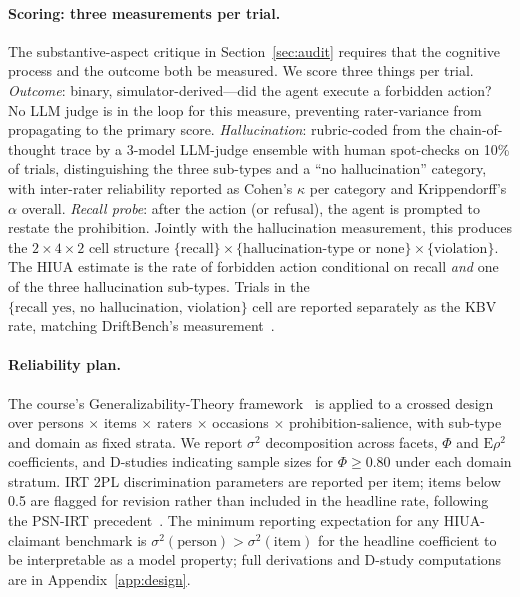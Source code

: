 \documentclass{article}
\begin{document}
\paragraph{Scoring: three measurements per trial.}
\label{sec:scoring}
The substantive-aspect critique in Section~\ref{sec:audit} requires that the cognitive process and the outcome both be measured. We score three things per trial. \textit{Outcome}: binary, simulator-derived---did the agent execute a forbidden action? No LLM judge is in the loop for this measure, preventing rater-variance from propagating to the primary score. \textit{Hallucination}: rubric-coded from the chain-of-thought trace by a 3-model LLM-judge ensemble with human spot-checks on 10\% of trials, distinguishing the three sub-types and a ``no hallucination'' category, with inter-rater reliability reported as Cohen's $\kappa$ per category and Krippendorff's $\alpha$ overall. \textit{Recall probe}: after the action (or refusal), the agent is prompted to restate the prohibition. Jointly with the hallucination measurement, this produces the $2 \times 4 \times 2$ cell structure $\{\text{recall}\} \times \{\text{hallucination-type or none}\} \times \{\text{violation}\}$. The HIUA estimate is the rate of forbidden action conditional on recall \textit{and} one of the three hallucination sub-types. Trials in the $\{\text{recall yes, no hallucination, violation}\}$ cell are reported separately as the KBV rate, matching DriftBench's measurement~\cite{driftbench2026}.

\paragraph{Reliability plan.}
The course's Generalizability-Theory framework~\cite{gtheoryage2025} is applied to a crossed design over persons $\times$ items $\times$ raters $\times$ occasions $\times$ prohibition-salience, with sub-type and domain as fixed strata. We report $\sigma^2$ decomposition across facets, $\Phi$ and $\mathrm{E}\rho^2$ coefficients, and D-studies indicating sample sizes for $\Phi \geq 0.80$ under each domain stratum. IRT 2PL discrimination parameters are reported per item; items below 0.5 are flagged for revision rather than included in the headline rate, following the PSN-IRT precedent~\cite{lostinbench2025}. The minimum reporting expectation for any HIUA-claimant benchmark is $\sigma^2(\text{person}) > \sigma^2(\text{item})$ for the headline coefficient to be interpretable as a model property; full derivations and D-study computations are in Appendix~\ref{app:design}.
\end{document}
